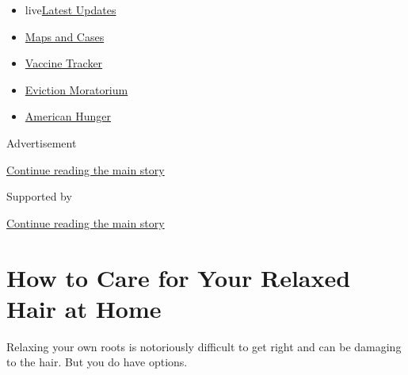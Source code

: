 \begin{itemize}
\tightlist
\item
  live\href{https://www.nytimes3xbfgragh.onion/2020/09/08/world/covid-19-coronavirus.html?name=styln-coronavirus-national\&region=TOP_BANNER\&block=storyline_menu_recirc\&action=click\&pgtype=Article\&impression_id=d8a9ccc0-f27a-11ea-acdb-e90d0686ccfb\&variant=undefined}{Latest
  Updates}
\item
  \href{https://www.nytimes3xbfgragh.onion/interactive/2020/us/coronavirus-us-cases.html?name=styln-coronavirus-national\&region=TOP_BANNER\&block=storyline_menu_recirc\&action=click\&pgtype=Article\&impression_id=d8a9ccc1-f27a-11ea-acdb-e90d0686ccfb\&variant=undefined}{Maps
  and Cases}
\item
  \href{https://www.nytimes3xbfgragh.onion/interactive/2020/science/coronavirus-vaccine-tracker.html?name=styln-coronavirus-national\&region=TOP_BANNER\&block=storyline_menu_recirc\&action=click\&pgtype=Article\&impression_id=d8a9ccc2-f27a-11ea-acdb-e90d0686ccfb\&variant=undefined}{Vaccine
  Tracker}
\item
  \href{https://www.nytimes3xbfgragh.onion/2020/09/02/your-money/eviction-moratorium-covid.html?name=styln-coronavirus-national\&region=TOP_BANNER\&block=storyline_menu_recirc\&action=click\&pgtype=Article\&impression_id=d8a9ccc3-f27a-11ea-acdb-e90d0686ccfb\&variant=undefined}{Eviction
  Moratorium}
\item
  \href{https://www.nytimes3xbfgragh.onion/interactive/2020/09/02/magazine/food-insecurity-hunger-us.html?name=styln-coronavirus-national\&region=TOP_BANNER\&block=storyline_menu_recirc\&action=click\&pgtype=Article\&impression_id=d8a9ccc4-f27a-11ea-acdb-e90d0686ccfb\&variant=undefined}{American
  Hunger}
\end{itemize}

Advertisement

\protect\hyperlink{after-top}{Continue reading the main story}

Supported by

\protect\hyperlink{after-sponsor}{Continue reading the main story}

\hypertarget{how-to-care-for-your-relaxed-hair-at-home}{%
\section{How to Care for Your Relaxed Hair at
Home}\label{how-to-care-for-your-relaxed-hair-at-home}}

Relaxing your own roots is notoriously difficult to get right and can be
damaging to the hair. But you do have options.

